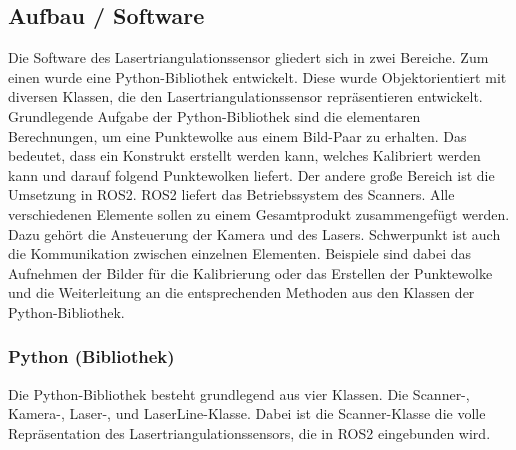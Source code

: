 	
	\label{chap:aufbau_hardware}
	
	\newpage
	
	\subsection{Aufbau / Software}
	Die Software des Lasertriangulationssensor gliedert sich in zwei Bereiche. Zum einen wurde eine Python-Bibliothek entwickelt. Diese wurde Objektorientiert mit diversen Klassen, die den Lasertriangulationssensor repräsentieren entwickelt. Grundlegende Aufgabe der Python-Bibliothek sind die elementaren Berechnungen, um eine Punktewolke aus einem Bild-Paar zu erhalten. Das bedeutet, dass ein Konstrukt erstellt werden kann, welches Kalibriert werden kann und darauf folgend Punktewolken liefert. \newline
	Der andere große Bereich ist die Umsetzung in ROS2. ROS2 liefert das Betriebssystem des Scanners. Alle verschiedenen Elemente sollen zu einem Gesamtprodukt zusammengefügt werden. Dazu gehört die Ansteuerung der Kamera und des Lasers. Schwerpunkt ist auch die Kommunikation zwischen einzelnen Elementen. Beispiele sind dabei das Aufnehmen der Bilder für die Kalibrierung oder das Erstellen der Punktewolke und die Weiterleitung an die entsprechenden Methoden aus den Klassen der Python-Bibliothek.
		\subsubsection{Python (Bibliothek)}
		Die Python-Bibliothek besteht grundlegend aus vier Klassen. Die Scanner-, Kamera-, Laser-, und LaserLine-Klasse. Dabei ist die Scanner-Klasse die volle Repräsentation des Lasertriangulationssensors, die in ROS2 eingebunden wird.
		
